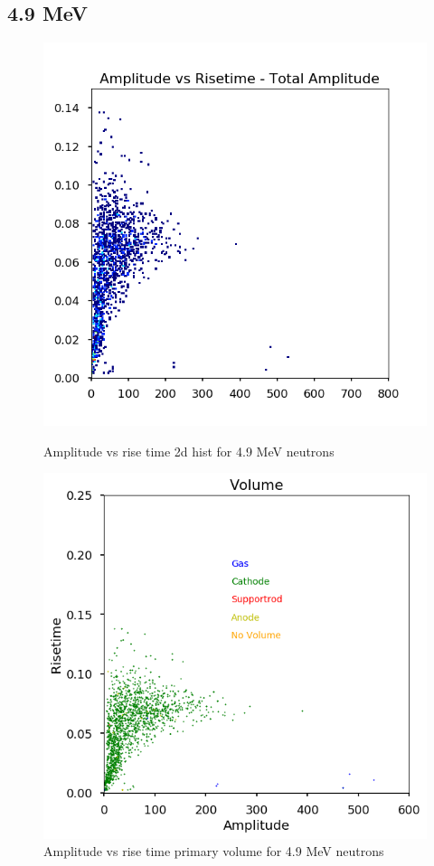 \documentclass[a4paper]{article}
\begin{document}
\subsection{4.9 MeV}
\begin{figure}[H]
    \centering
    \begin{minipage}{.5\textwidth}
        \centering
        \includegraphics[width=1\linewidth]{Fast/steel_achinos-2d_fast-4.png}
        \caption{Amplitude vs rise time 2d hist for 4.9 MeV neutrons}
        \label{fig:prob1_6_2}
    \end{minipage}%
    \begin{minipage}{0.5\textwidth}
        \centering
        \includegraphics[width=1\linewidth]{Fast/steel_achinos_vol_38_fast-4.png}
        \caption{Amplitude vs rise time primary volume for 4.9 MeV neutrons}
        \label{fig:prob1_6_1}
    \end{minipage}
\end{figure}
\end{document}
